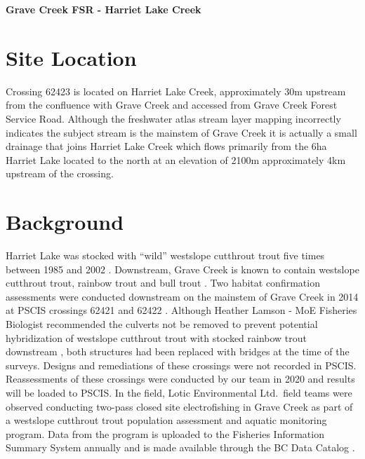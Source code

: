 \documentclass[
]{book}
\begin{document}
\textbf{Grave Creek FSR - Harriet Lake Creek}

\hypertarget{site-location-3}{%
\section*{Site Location}\label{site-location-3}}

Crossing 62423 is located on Harriet Lake Creek, approximately 30m upstream from the confluence with Grave Creek and accessed from Grave Creek Forest Service Road. Although the freshwater atlas stream layer mapping incorrectly indicates the subject stream is the mainstem of Grave Creek it is actually a small drainage that joins Harriet Lake Creek which flows primarily from the 6ha Harriet Lake located to the north at an elevation of 2100m approximately 4km upstream of the crossing.

\hypertarget{background-4}{%
\section*{Background}\label{background-4}}

Harriet Lake was stocked with ``wild'' westslope cutthrout trout five times between 1985 and 2002 \citep{bcmoeFishInventoriesData2020}. Downstream, Grave Creek is known to contain westslope cutthrout trout, rainbow trout and bull trout \citep{data_fish_obs}. Two habitat confirmation assessments were conducted downstream on the mainstem of Grave Creek in 2014 at PSCIS crossings 62421 and 62422 \citep{masseEKConfirmation2015}. Although Heather Lamson - MoE Fisheries Biologist recommended the culverts not be removed to prevent potential hybridization of westslope cutthrout trout with stocked rainbow trout downstream \citep{masseEKConfirmation2015}, both structures had been replaced with bridges at the time of the surveys. Designs and remediations of these crossings were not recorded in PSCIS. Reassessments of these crossings were conducted by our team in 2020 and results will be loaded to PSCIS. In the field, Lotic Environmental Ltd.~field teams were observed conducting two-pass closed site electrofishing in Grave Creek as part of a westslope cutthrout trout population assessment and aquatic monitoring program. Data from the program is uploaded to the Fisheries Information Summary System annually and is made available through the BC Data Catalog \citep{data_fish_obs, moeStreamInventorySample}.
\end{document}
